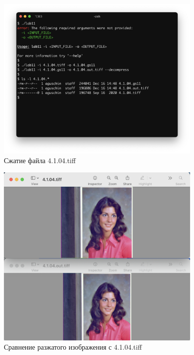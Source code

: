 \documentclass[a4paper,oneside]{article}
\theoremstyle{definition}
\begin{document}
\begin{figure}[H]
  \centering
  \includegraphics[width=0.9\textwidth]{test1.jpg}
  \caption{Сжатие файла 4.1.04.tiff}
  \label{fig:test_1}
\end{figure}

\begin{figure}[H]
  \centering
  \includegraphics[width=0.9\textwidth]{test1_img.jpg}
  \caption{Сравнение разжатого изображения с 4.1.04.tiff}
  \label{fig:test_1_img}
\end{figure}
\end{document}
